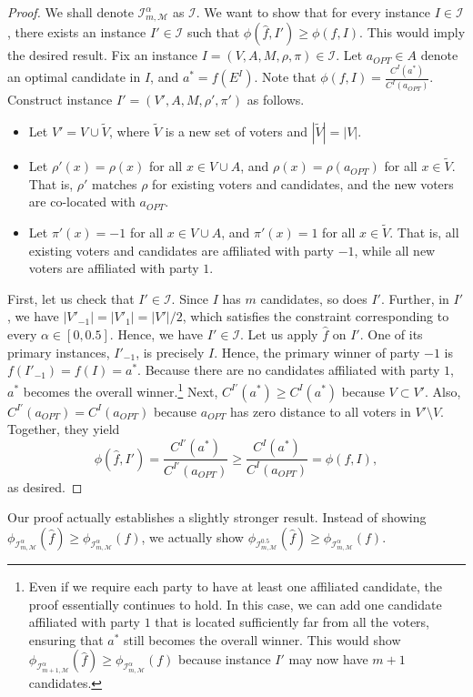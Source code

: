 \documentclass[letterpaper]{article} %
\theoremstyle{definition}
\renewcommand{\hat}{\widehat}
\renewcommand{\tilde}{\widetilde}
\newcommand{\calI}{\mathcal{I}}
\newcommand{\calM}{\mathcal{M}}
\newcommand{\pleft}{-1}
\newcommand{\pright}{1}
\newcommand{\I}{\calI}
\begin{document}
\begin{proof}
We shall denote $\I^{\alpha}_{m,\calM}$ as $\I$. We want to show that for every instance $I \in \I$, there exists an instance $I' \in \I$ such that $\phi(\hat{f},I') \ge \phi(f,I)$. This would imply the desired result.
	Fix an instance $I = (V,A,M,\rho,\pi) \in \I$. Let $a_{OPT} \in A$ denote an optimal candidate in $I$, and $a^* = f(E^I)$. Note that $\phi(f,I) = \frac{C^I(a^*)}{C^I(a_{OPT})}$. Construct instance $I' = (V',A,M,\rho',\pi')$ as follows.
	\begin{itemize}
		\item Let $V' = V \cup \tilde{V}$, where $\tilde{V}$ is a new set of voters and $|\tilde{V}| = |V|$.
		\item Let $\rho'(x) = \rho(x)$ for all $x \in V \cup A$, and $\rho(x) = \rho(a_{OPT})$ for all $x \in \tilde{V}$. That is, $\rho'$ matches $\rho$ for existing voters and candidates, and the new voters are co-located with $a_{OPT}$.
		\item Let $\pi'(x) = \pleft$ for all $x \in V \cup A$, and $\pi'(x) = \pright$ for all $x \in \tilde{V}$. That is, all existing voters and candidates are affiliated with party $\pleft$, while all new voters are affiliated with party $\pright$.
	\end{itemize}
	First, let us check that $I' \in \I$. Since $I$ has $m$ candidates, so does $I'$. Further, in $I'$, we have $|V'_{\pleft}| = |V'_{\pright}| = |V'|/2$, which satisfies the constraint corresponding to every $\alpha \in [0,0.5]$. Hence, we have $I' \in \I$.
	Let us apply $\hat{f}$ on $I'$. One of its primary instances, $I'_{\pleft}$, is precisely $I$. Hence, the primary winner of party $\pleft$ is $f(I'_{\pleft}) = f(I) = a^*$. Because there are no candidates affiliated with party $\pright$, $a^*$ becomes the overall winner.\footnote{Even if we require each party to have at least one affiliated candidate, the proof essentially continues to hold. In this case, we can add one candidate affiliated with party $\pright$ that is located sufficiently far from all the voters, ensuring that $a^*$ still becomes the overall winner. This would show $\phi_{\I^{\alpha}_{m+1,\calM}}(\hat{f}) \ge \phi_{\I^{\alpha}_{m,\calM}}(f)$ because instance $I'$ may now have $m+1$ candidates.}
	Next, $C^{I'}(a^*) \ge C^I(a^*)$ because $V \subset V'$. Also, $C^{I'}(a_{OPT}) = C^I(a_{OPT})$ because $a_{OPT}$ has zero distance to all voters in $V' \setminus V$. Together, they yield
	\begin{equation}
	\phi(\hat{f},I') = \frac{C^{I'}(a^*)}{C^{I'}(a_{OPT})} \ge \frac{C^I(a^*)}{C^I(a_{OPT})} = \phi(f,I),
	\label{eqn:translate-worst-case}
	\end{equation}
	as desired.
\end{proof}
Our proof actually establishes a slightly stronger result. Instead of showing $\phi_{\I^{\alpha}_{m,\calM}}(\hat{f}) \ge \phi_{\I^{\alpha}_{m,\calM}}(f)$, we actually show $\phi_{\I^{0.5}_{m,\calM}}(\hat{f}) \ge \phi_{\I^{\alpha}_{m,\calM}}(f)$.
\end{document}
